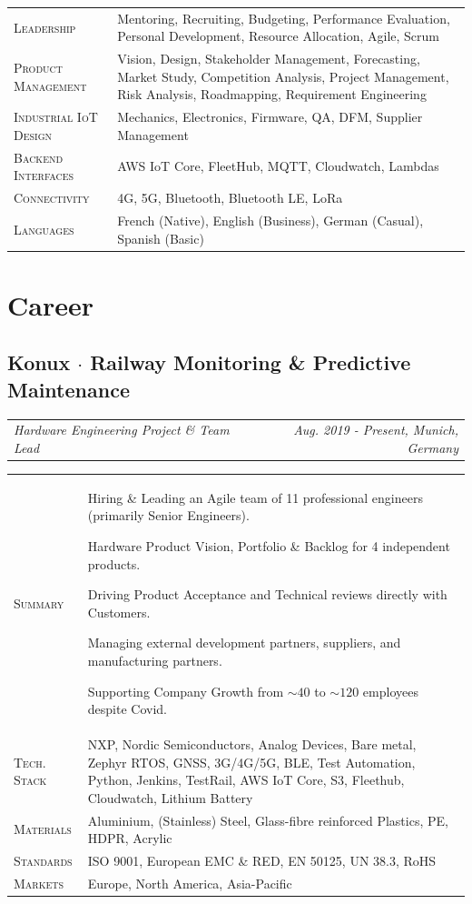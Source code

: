 \documentclass[10pt,a4paper]{moderncv}
\newcommand*{\makecareersubsection}[5]{
  \vspace{0.75em}
  \subsection{#1 {\color{color2}$\cdot$ #2}}
  \addvspace{-0.2em}
  {
    \color{color2}
    \begin{tabularx}{\textwidth}{LR}
      {\itshape #3} & {\itshape #4, #5}
    \end{tabularx}\par
  }
  \addvspace{1.25em}
  }
\begin{document}
  \begin{tabularx}{\textwidth}{>{\scshape}l@{\hskip 3.5mm}L}
    Leadership & Mentoring, Recruiting, Budgeting, Performance Evaluation, Personal Development, Resource Allocation, Agile, Scrum\\
    Product Management & Vision, Design, Stakeholder Management, Forecasting, Market Study, Competition Analysis, Project Management, Risk Analysis, Roadmapping, Requirement Engineering\\
    Industrial IoT Design & Mechanics, Electronics, Firmware, QA, DFM, Supplier Management\\
    Backend Interfaces & AWS IoT Core, FleetHub, MQTT, Cloudwatch,  Lambdas\\
    Connectivity & 4G, 5G, Bluetooth, Bluetooth LE, LoRa\\
    Languages & French (Native), English (Business), German (Casual), Spanish (Basic)
  \end{tabularx}

\section{Career}

  \vspace{-0.5em}

  \makecareersubsection{Konux}{Railway Monitoring \& Predictive Maintenance}
    {Hardware Engineering Project \& Team Lead}
    {Aug. 2019 - Present}
    {Munich, Germany}

  \begin{tabularx}{\textwidth}{>{\scshape}l@{\hskip 3.5mm}L}
    Summary & Hiring \& Leading an Agile team of 11 professional engineers (primarily Senior Engineers).
    \par Hardware Product Vision, Portfolio \& Backlog for 4 independent products.
    \par Driving Product Acceptance and Technical reviews directly with Customers.
    \par Managing external development partners, suppliers, and manufacturing partners.
    \par Supporting Company Growth from $\sim 40$ to $\sim 120$ employees despite Covid.\\
    Tech. Stack & NXP, Nordic Semiconductors, Analog Devices, Bare metal, Zephyr RTOS, GNSS, 3G/4G/5G, BLE, Test Automation, Python, Jenkins, TestRail, AWS IoT Core, S3, Fleethub, Cloudwatch, Lithium Battery\\
    Materials &  Aluminium, (Stainless) Steel, Glass-fibre reinforced Plastics, PE, HDPR, Acrylic\\
    Standards & ISO 9001, European EMC \& RED, EN 50125, UN 38.3, RoHS\\
    Markets & Europe, North America, Asia-Pacific\\
  \end{tabularx}
\end{document}
